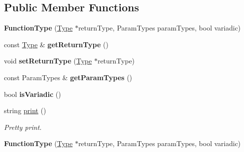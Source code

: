 \subsection*{Public Member Functions}
\begin{DoxyCompactItemize}
\item 
\mbox{\label{classspan_1_1ir_1_1types_1_1FunctionType_a72df7dbe5a7aa9523288492dc39c104b}} 
{\bfseries Function\+Type} (\hyperlink{classspan_1_1ir_1_1types_1_1Type}{Type} $\ast$return\+Type, Param\+Types param\+Types, bool variadic)
\item 
\mbox{\label{classspan_1_1ir_1_1types_1_1FunctionType_ab27244f776cf5b95946a84a69503019c}} 
const \hyperlink{classspan_1_1ir_1_1types_1_1Type}{Type} \& {\bfseries get\+Return\+Type} ()
\item 
\mbox{\label{classspan_1_1ir_1_1types_1_1FunctionType_a2c091e9812b4c5efdc2ef399dcfc9c0d}} 
void {\bfseries set\+Return\+Type} (\hyperlink{classspan_1_1ir_1_1types_1_1Type}{Type} $\ast$return\+Type)
\item 
\mbox{\label{classspan_1_1ir_1_1types_1_1FunctionType_a82895076fe4fa24ad75837183a4fe464}} 
const Param\+Types \& {\bfseries get\+Param\+Types} ()
\item 
\mbox{\label{classspan_1_1ir_1_1types_1_1FunctionType_a6df6ec9c5f6d0b567ce3de8684d98525}} 
bool {\bfseries is\+Variadic} ()
\item 
\mbox{\label{classspan_1_1ir_1_1types_1_1FunctionType_ac9d14eeafefd7921c13e436323216287}} 
string \hyperlink{classspan_1_1ir_1_1types_1_1FunctionType_ac9d14eeafefd7921c13e436323216287}{print} ()
\begin{DoxyCompactList}\small\item\em Pretty print. \end{DoxyCompactList}\item 
\mbox{\label{classspan_1_1ir_1_1types_1_1FunctionType_a7b247207bf6cbcb84677b5fc80048d91}} 
{\bfseries Function\+Type} (\hyperlink{classspan_1_1ir_1_1types_1_1Type}{Type} $\ast$return\+Type, Param\+Types param\+Types, bool variadic)

\end{DoxyCompactItemize}
